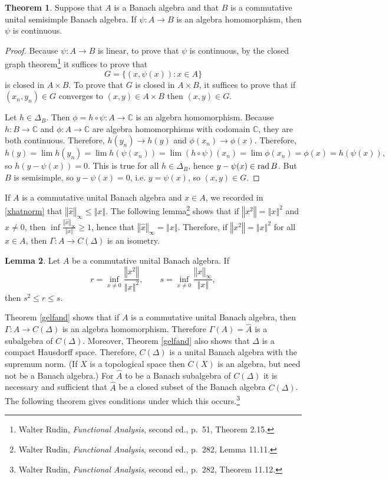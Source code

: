 \documentclass{article}
\newcommand{\rad}{\ensuremath\mathrm{rad}\,}
\newcommand{\norm}[1]{\left\Vert #1 \right\Vert}
\theoremstyle{definition}
\newtheorem{theorem}{Theorem}
\newtheorem{lemma}[theorem]{Lemma}
\theoremstyle{definition}
\begin{document}
\begin{theorem}
Suppose that $A$ is a Banach algebra and that $B$ is a commutative unital semisimple Banach algebra. If $\psi:A \to B$
is an algebra homomorphism, then $\psi$ is continuous.
\end{theorem}
\begin{proof}
Because $\psi:A \to B$ is linear, to prove that $\psi$ is continuous,  by
the closed graph theorem\footnote{Walter Rudin, {\em Functional Analysis}, second ed., p.~51, Theorem 2.15.}
it suffices to prove that
\[
G = \{(x,\psi (x)): x \in A\}
\]
is closed in $A \times B$. To prove that $G$ is closed in $A \times B$, it suffices to prove that
if  $(x_n,y_n) \in G$ converges to $(x,y) \in A \times B$ then $(x,y) \in G$. 

Let $h \in \Delta_B$. Then $\phi = h \circ \psi:A \to \mathbb{C}$ is an algebra homomorphism. Because $h:B \to \mathbb{C}$ and
$\phi:A \to \mathbb{C}$ are algebra homomorphisms with codomain $\mathbb{C}$, they are both continuous. Therefore, 
$h(y_n) \to h(y)$ and $\phi(x_n) \to \phi(x)$. Therefore,
\[
h(y) = \lim h(y_n) = \lim h(\psi(x_n)) = \lim (h \circ \psi)(x_n) = \lim \phi(x_n) = \phi(x) = h(\psi(x)),
\]
so $h(y-\psi(x))=0$. This is true for all $h \in \Delta_B$, hence $y-\psi(x) \in \rad B$. But $B$ is semisimple, so $y-\psi(x)=0$, i.e. 
$y=\psi(x)$, so $(x,y) \in G$.
\end{proof}

If $A$ is a commutative unital Banach algebra and $x \in A$, we recorded in \eqref{xhatnorm} that
$\norm{\hat{x}}_\infty \leq \norm{x}$. The following lemma\footnote{Walter Rudin, {\em Functional Analysis}, second ed.,
p.~282, Lemma 11.11.}  shows that if $\norm{x^2} = \norm{x}^2$ and $x \neq 0$, then
$\inf \frac{\norm{\hat{x}}_\infty}{\norm{x}} \geq 1$, hence that $\norm{\hat{x}}_\infty = \norm{x}$. Therefore, if $\norm{x^2}=\norm{x}^2$ for all $x \in A$,
then $\Gamma:A \to C(\Delta)$ is an isometry.

\begin{lemma}
Let $A$ be a commutative unital Banach algebra. If
\[
r= \inf_{x \neq 0} \frac{\norm{x^2}}{\norm{x}^2}, \qquad s = \inf_{x \neq 0} \frac{\norm{\hat{x}}_\infty}{\norm{x}},
\]
then $s^2 \leq r \leq s$.
\label{normlemma}
\end{lemma}

Theorem \ref{gelfand} shows that if $A$ is a commutative unital Banach algebra, then $\Gamma:A \to C(\Delta)$ is an algebra homomorphism.
Therefore $\Gamma(A)=\widehat{A}$ is a subalgebra of $C(\Delta)$.
Moreover,
Theorem \ref{gelfand} also shows  that $\Delta$ is a compact
Hausdorff space. Therefore, $C(\Delta)$ is  a unital Banach algebra with the supremum norm. (If $X$ is a topological space then $C(X)$ is an algebra, but need not
be a Banach algebra.) For $\widehat{A}$ to be a Banach subalgebra of $C(\Delta)$ it is necessary and sufficient that $\widehat{A}$ be a closed
subset of the Banach algebra $C(\Delta)$. The following theorem gives conditions under which this occurs.\footnote{Walter Rudin, {\em Functional Analysis}, second ed., p.~282, Theorem 11.12.}
\end{document}
